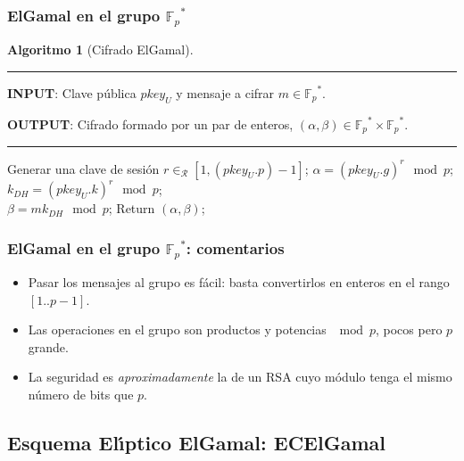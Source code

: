 \documentclass{beamer}
\newcommand{\Fp}{\ensuremath{\mathbb{F}_p}}%
\theoremstyle{plain}        			%
\theoremstyle{definition}   			%
\theoremstyle{saltolinea}   			%
\newtheorem{algo}{Algoritmo}
\begin{document}
\begin{frame}
\frametitle{ElGamal en el grupo $\Fp^*$}
	\pause
	\begin{algo}[Cifrado ElGamal]\label{alg:ElGamal}
	\parbox[b]{\linewidth}{%
	\hrule
	\smallskip
	{\bf INPUT}: Clave p\'ublica $pkey_U$ y mensaje a cifrar $m\in\Fp^*$.
	
	{\bf OUTPUT}: Cifrado formado por un par de enteros, $(\alpha,\beta)\in\Fp^*\times\Fp^*$.
	\hrule
	}%
	\begin{algorithmic}[1]
	\STATE Generar una clave de sesi\'on $r\in_{\mathcal{R}}\left[1,\left(pkey_U.p\right)-1\right]$;
	\STATE $\alpha=(pkey_U.g)^r\mod p$;
	\STATE $k_{DH}=(pkey_U.k)^r\mod p$; \\
	\STATE $\beta=mk_{DH}\mod p$;
	\STATE Return $(\alpha,\beta)$;
	\end{algorithmic}
	\end{algo}%
\end{frame}


\begin{frame}
\frametitle{ElGamal en el grupo $\Fp^*$: comentarios}
	\pause
	\begin{itemize}[<+-| alert@+>]
		\item Pasar los mensajes al grupo es f\'acil: basta convertirlos en enteros en el rango $[1..p-1]$.
		\item Las operaciones en el grupo son productos y potencias $\mod p$, pocos pero $p$ grande.
		\item La seguridad es \emph{aproximadamente} la de un RSA cuyo m\'odulo tenga el mismo n\'umero de bits que $p$.
	\end{itemize}
\end{frame}

\subsection{Esquema El\'{\i}ptico ElGamal: ECElGamal}
\end{document}
